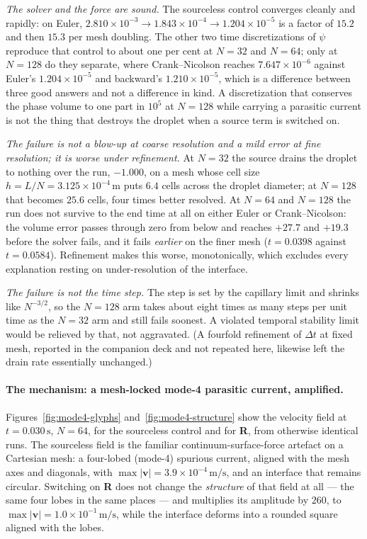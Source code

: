 \documentclass[preprint,3p,11pt]{elsarticle}
\newcommand{\psilev}{\psi}
\begin{document}
\emph{The solver and the force are sound.} The sourceless control converges
cleanly and rapidly: on Euler, $2.810\times10^{-3} \to 1.843\times10^{-4} \to
1.204\times10^{-5}$ is a factor of $15.2$ and then $15.3$ per mesh doubling. The
other two time discretizations of $\psilev$ reproduce that control to about one
per cent at $N=32$ and $N=64$; only at $N=128$ do they separate, where
Crank--Nicolson reaches $7.647\times10^{-6}$ against Euler's
$1.204\times10^{-5}$ and backward's $1.210\times10^{-5}$, which is a difference
between three good answers and not a difference in kind. A discretization that
conserves the phase volume to one part in $10^5$ at $N=128$ while carrying a
parasitic current is not the thing that destroys the droplet when a source term
is switched on.

\emph{The failure is not a blow-up at coarse resolution and a mild error at fine
resolution; it is worse under refinement.} At $N=32$ the source drains the
droplet to nothing over the run, $-1.000$, on a mesh whose cell size
$h = L/N = 3.125\times10^{-4}\,\mathrm{m}$ puts $6.4$ cells across the droplet
diameter; at $N=128$ that becomes $25.6$ cells, four times better resolved. At
$N=64$ and $N=128$ the run does not survive to the end time at all on either
Euler or Crank--Nicolson: the volume error passes
through zero from below and reaches $+27.7$ and $+19.3$ before the solver fails,
and it fails \emph{earlier} on the finer mesh ($t=0.0398$ against $t=0.0584$).
Refinement makes this worse, monotonically, which excludes every explanation
resting on under-resolution of the interface.

\emph{The failure is not the time step.} The step is set by the capillary limit
and shrinks like $N^{-3/2}$, so the $N=128$ arm takes about eight times as many
steps per unit time as the $N=32$ arm and still fails soonest. A violated
temporal stability limit would be relieved by that, not aggravated. (A fourfold
refinement of $\Delta t$ at fixed mesh, reported in the companion deck and not
repeated here, likewise left the drain rate essentially unchanged.)

\paragraph{The mechanism: a mesh-locked mode-4 parasitic current, amplified.}
Figures~\ref{fig:mode4-glyphs} and~\ref{fig:mode4-structure} show the velocity
field at $t=0.030\,\mathrm{s}$, $N=64$, for the sourceless control and for
\textbf{R}, from otherwise identical runs. The sourceless field is the familiar
continuum-surface-force artefact on a Cartesian mesh: a four-lobed (mode-4)
spurious current, aligned with the mesh axes and diagonals, with
$\max|\mathbf{v}| = 3.9\times10^{-4}\,\mathrm{m/s}$, and an interface that
remains circular. Switching on \textbf{R} does not change the \emph{structure} of
that field at all --- the same four lobes in the same places --- and multiplies
its amplitude by $260$, to
$\max|\mathbf{v}| = 1.0\times10^{-1}\,\mathrm{m/s}$, while the interface deforms
into a rounded square aligned with the lobes.
\end{document}
